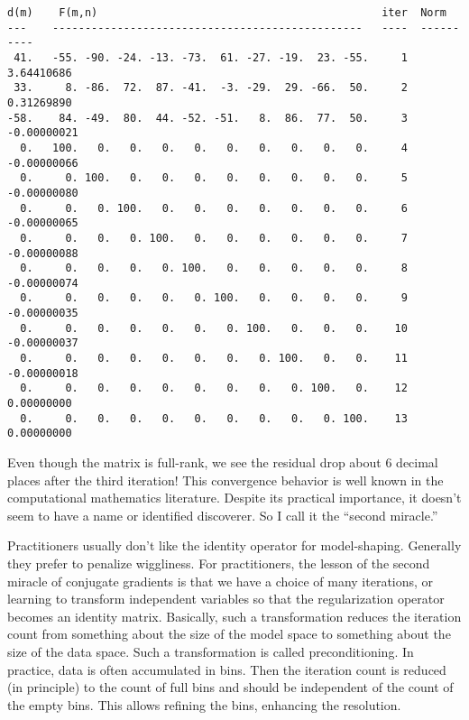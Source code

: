 \par\noindent
\footnotesize
\begin{verbatim}
d(m)    F(m,n)                                            iter  Norm
---    ------------------------------------------------   ----  ----------
 41.   -55. -90. -24. -13. -73.  61. -27. -19.  23. -55.     1  3.64410686
 33.     8. -86.  72.  87. -41.  -3. -29.  29. -66.  50.     2  0.31269890
-58.    84. -49.  80.  44. -52. -51.   8.  86.  77.  50.     3 -0.00000021
  0.   100.   0.   0.   0.   0.   0.   0.   0.   0.   0.     4 -0.00000066
  0.     0. 100.   0.   0.   0.   0.   0.   0.   0.   0.     5 -0.00000080
  0.     0.   0. 100.   0.   0.   0.   0.   0.   0.   0.     6 -0.00000065
  0.     0.   0.   0. 100.   0.   0.   0.   0.   0.   0.     7 -0.00000088
  0.     0.   0.   0.   0. 100.   0.   0.   0.   0.   0.     8 -0.00000074
  0.     0.   0.   0.   0.   0. 100.   0.   0.   0.   0.     9 -0.00000035
  0.     0.   0.   0.   0.   0.   0. 100.   0.   0.   0.    10 -0.00000037
  0.     0.   0.   0.   0.   0.   0.   0. 100.   0.   0.    11 -0.00000018
  0.     0.   0.   0.   0.   0.   0.   0.   0. 100.   0.    12  0.00000000
  0.     0.   0.   0.   0.   0.   0.   0.   0.   0. 100.    13  0.00000000
\end{verbatim}
\normalsize
\par\noindent
Even though the matrix is full-rank,
we see the residual drop about 6 decimal places after the third iteration!
This convergence behavior is well known
in the computational mathematics literature.
Despite its practical importance,
it doesn't seem to have a name or identified discoverer.
So I call it the ``second miracle.''

\par
Practitioners usually don't like
the identity operator for model-shaping.
Generally they prefer to penalize wiggliness.
For practitioners,
the lesson of the second miracle of conjugate gradients
is that we have a choice of many iterations,
or learning to transform
independent variables so that
the regularization operator becomes an identity matrix.
Basically, such a transformation reduces the iteration count
from    something about the size of the model space
to      something about the size of the data space.
Such a transformation is called preconditioning.
In practice, data is often accumulated in bins.
Then the iteration count is reduced (in principle)
to the count of full bins
and should be independent of the count of the empty bins.
This allows refining the bins, enhancing the resolution.


